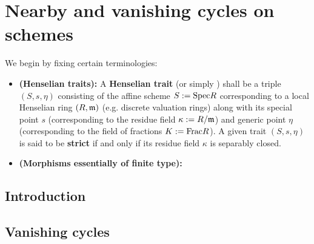 \section{Nearby and vanishing cycles on schemes}
    We begin by fixing certain terminologies:
    \begin{convention}
        \noindent
        \begin{itemize}
            \item \textbf{(Henselian traits):} A \textbf{Henselian trait} (or simply ) shall be a triple $(S, s, \eta)$ consisting of the affine scheme $S := \mathrm{Spec} R$ corresponding to a local Henselian ring $(R, \mathfrak{m})$ (e.g. discrete valuation rings) along with its special point $s$ (corresponding to the residue field $\kappa := R/\mathfrak{m}$) and generic point $\eta$ (corresponding to the field of fractions $K := \mathrm{Frac} R$). A given trait $(S, s, \eta)$ is said to be \textbf{strict} if and only if its residue field $\kappa$ is separably closed. 
            \item \textbf{(Morphisms essentially of finite type):} 
        \end{itemize}
    \end{convention}
    
    \subsection{Introduction}
        
    \subsection{Vanishing cycles}